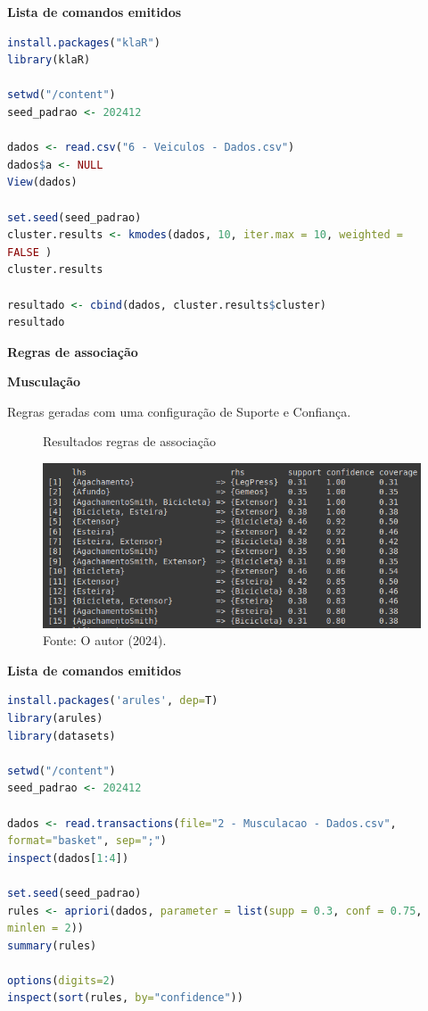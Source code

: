 \begin{center}
    \textbf{Lista de comandos emitidos}
\end{center}


\begin{lstlisting}[language=R, style=input]
install.packages("klaR")
library(klaR)

setwd("/content")
seed_padrao <- 202412

dados <- read.csv("6 - Veiculos - Dados.csv")
dados$a <- NULL
View(dados)

set.seed(seed_padrao)
cluster.results <- kmodes(dados, 10, iter.max = 10, weighted =
FALSE )
cluster.results

resultado <- cbind(dados, cluster.results$cluster)
resultado
\end{lstlisting}


\begin{adjustwidth}{1em}{}
\textbf{Regras de associação}
\end{adjustwidth}

\begin{center}
    \textbf{Musculação}
\end{center}

Regras geradas com uma configuração de Suporte e Confiança.


\begin{figure}[H]
\centering
\caption{Resultados regras de associação}
\includegraphics[width=\linewidth]{apendices/fig/8_IAA008_17.png}
\caption*{Fonte: O autor (2024).}
\end{figure}

\begin{center}
    \textbf{Lista de comandos emitidos}
\end{center}


\begin{lstlisting}[language=R, style=input]
install.packages('arules', dep=T)
library(arules)
library(datasets)

setwd("/content")
seed_padrao <- 202412

dados <- read.transactions(file="2 - Musculacao - Dados.csv",
format="basket", sep=";")
inspect(dados[1:4])

set.seed(seed_padrao)
rules <- apriori(dados, parameter = list(supp = 0.3, conf = 0.75,
minlen = 2))
summary(rules)

options(digits=2)
inspect(sort(rules, by="confidence"))
\end{lstlisting}